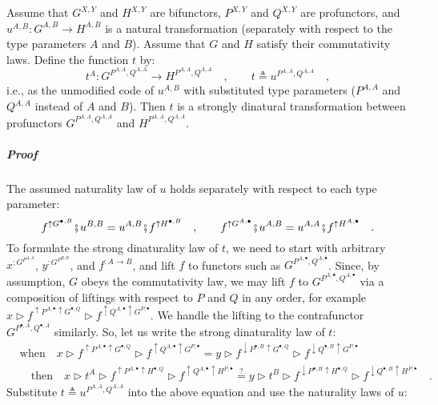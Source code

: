 Assume that $G^{X,Y}$ and $H^{X,Y}$ are bifunctors, $P^{X,Y}$ and
$Q^{X,Y}$ are profunctors, and $u^{A,B}:G^{A,B}\rightarrow H^{A,B}$
is a natural transformation (separately with respect to the type parameters
$A$ and $B$). Assume that $G$ and $H$ satisfy their commutativity
laws. Define the function $t$ by:
\[
t^{A}:G^{P^{A,A},Q^{A,A}}\rightarrow H^{P^{A,A},Q^{A,A}}\quad,\quad\quad t\triangleq u^{P^{A,A},Q^{A,A}}\quad,
\]
i.e., as the unmodified code of $u^{A,B}$ with substituted type parameters
($P^{A,A}$ and $Q^{A,A}$ instead of $A$ and $B$). Then $t$ is
a strongly dinatural transformation between profunctors $G^{P^{A,A},Q^{A,A}}$
and $H^{P^{A,A},Q^{A,A}}$.

\subparagraph{Proof}

The assumed naturality law of $u$ holds separately with respect to
each type parameter:
\[
f^{\uparrow G^{\bullet,B}}\bef u^{B,B}=u^{A,B}\bef f^{\uparrow H^{\bullet,B}}\quad,\quad\quad f^{\uparrow G^{A,\bullet}}\bef u^{A,B}=u^{A,A}\bef f^{\uparrow H^{A,\bullet}}\quad.
\]
To formulate the strong dinaturality law of $t$, we need to start
with arbitrary $x^{:G^{P^{A,A}}}$, $y^{:G^{P^{B,B}}}$, and $f^{:A\rightarrow B}$,
and lift $f$ to functors such as $G^{P^{A,\bullet},Q^{A,\bullet}}$.
Since, by assumption, $G$ obeys the commutativity law, we may lift
$f$ to $G^{P^{A,\bullet},Q^{A,\bullet}}$ via a composition of liftings
with respect to $P$ and $Q$ in any order, for example $x\triangleright f^{\uparrow P^{A,\bullet}\uparrow G^{\bullet,Q}}\triangleright f^{\uparrow Q^{A,\bullet}\uparrow G^{P,\bullet}}$.
We handle the lifting to the contrafunctor $G^{P^{\bullet,A},Q^{\bullet,A}}$
similarly. So, let us write the strong dinaturality law of $t$: 
\begin{align*}
 & \text{when}\quad x\triangleright f^{\uparrow P^{A,\bullet}\uparrow G^{\bullet,Q}}\triangleright f^{\uparrow Q^{A,\bullet}\uparrow G^{P,\bullet}}=y\triangleright f^{\downarrow P^{\bullet,B}\uparrow G^{\bullet,Q}}\triangleright f^{\downarrow Q^{\bullet,B}\uparrow G^{P,\bullet}}\\
 & \quad\text{then}\quad x\triangleright t^{A}\triangleright f^{\uparrow P^{A,\bullet}\uparrow H^{\bullet,Q}}\triangleright f^{\uparrow Q^{A,\bullet}\uparrow H^{P,\bullet}}\overset{?}{=}y\triangleright t^{B}\triangleright f^{\downarrow P^{\bullet,B}\uparrow H^{\bullet,Q}}\triangleright f^{\downarrow Q^{\bullet,B}\uparrow H^{P,\bullet}}\quad.
\end{align*}
Substitute $t\triangleq u^{P^{A,A},Q^{A,A}}$ into the above equation
and use the naturality laws of $u$:
